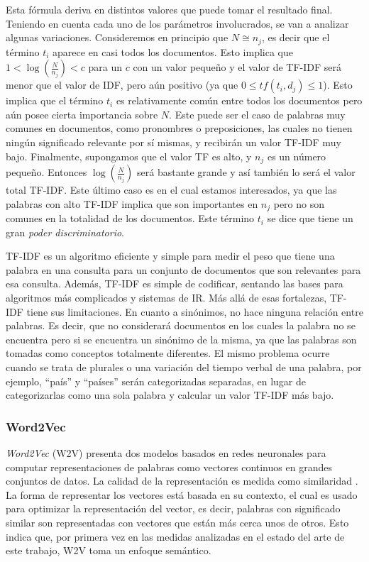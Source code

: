 Esta fórmula deriva en distintos valores que puede tomar el resultado final. Teniendo en cuenta cada uno de los parámetros involucrados, se van a analizar algunas variaciones. Consideremos en principio que \(N \cong n_j\), es decir que el término \(t_i\) aparece en casi todos los documentos. Esto implica que \(1 < \log(\frac{N}{n_j}) < c \) para un \(c\) con un valor pequeño y el valor de TF-IDF será menor que el valor de IDF, pero aún positivo (ya que \(0 \leq tf(t_i,d_j) \leq 1\)). Esto implica que el término \(t_i\) es relativamente común entre todos los documentos pero aún posee cierta importancia sobre \(N\). Este puede ser el caso de palabras muy comunes en documentos, como pronombres o preposiciones, las cuales no tienen ningún significado relevante por sí mismas, y recibirán un valor TF-IDF muy bajo. Finalmente, supongamos que el valor TF es alto, y \(n_j\) es un número pequeño. Entonces \(\log(\frac{N}{n_j})\) será bastante grande y así también lo será el valor total TF-IDF. Este último caso es en el cual estamos interesados, ya que las palabras con alto TF-IDF implica que son importantes en \(n_j\) pero no son comunes en la totalidad de los documentos. Este término \(t_i\) se dice que tiene un gran \textit{poder discriminatorio}.

\bigskip TF-IDF es un algoritmo eficiente y simple para medir el peso que tiene una palabra en una consulta para un conjunto de documentos que son relevantes para esa consulta. Además, TF-IDF es simple de codificar, sentando las bases para algoritmos más complicados y sistemas de IR. Más allá de esas fortalezas, TF-IDF tiene sus limitaciones. En cuanto a sinónimos, no hace ninguna relación entre palabras. Es decir, que no considerará documentos en los cuales la palabra no se encuentra pero si se encuentra un sinónimo de la misma, ya que las palabras son tomadas como conceptos totalmente diferentes. El mismo problema ocurre cuando se trata de plurales o una variación del tiempo verbal de una palabra, por ejemplo, “país” y “países” serán categorizadas separadas, en lugar de categorizarlas como una sola palabra y calcular un valor TF-IDF más bajo.

\subsubsection{Word2Vec}
\textit{Word2Vec} (W2V) presenta dos modelos basados en redes neuronales para computar representaciones de palabras como vectores continuos en grandes conjuntos de datos. La calidad de la representación es medida como similaridad \citep{mikolov2013efficient}. La forma de representar los vectores está basada en su contexto, el cual es usado para optimizar la representación del vector, es decir, palabras con significado similar son representadas con vectores que están más cerca unos de otros. Esto indica que, por primera vez en las medidas analizadas en el estado del arte de este trabajo, W2V toma un enfoque semántico.

